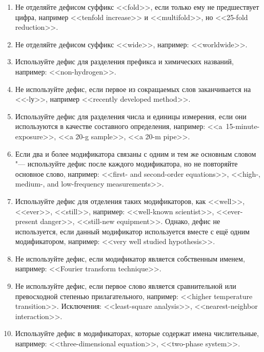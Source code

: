 \documentclass[a5paper, 10pt, twoside, numbers=enddot]{scrartcl}
\begin{document}
\begin{enumerate}
\begin{enumerate}
      \item Не отделяйте дефисом суффикс <<fold>>, если только ему не предшествует цифра, например
        <<tenfold increase>> и <<multifold>>, но <<25-fold reduction>>.

      \item Не отделяйте дефисом суффикс <<wide>>, например: <<worldwide>>.

      \item Используйте дефис для разделения префикса и химических названий, например:
        <<non-hydrogen>>.

      \item Не используйте дефис, если первое из сокращаемых слов заканчивается на <<-lу>>, например
        <<recently developed method>>.

      \item Используйте дефис для разделения числа и единицы измерения, если они используются в
        качестве составного определения, например: <<a~15-minute-exposure>>, <<a 20-g sample>>, <<a
        20-m pipe>>.

      \item Если два и более модификатора связаны с одним и тем же основным словом "--- используйте
        дефис после каждого модификатора, но не повторяйте основное слово, например: <<first- and
        second-order equations>>, <<high-, medium-, and low-frequency measurements>>.

      \item Используйте дефис для отделения таких модификаторов, как <<well>>, <<ever>>, <<still>>,
        например: <<well-known scientist>>, <<ever-present danger>>, <<still-new equipment>>. Однако,
        дефис не используется, если данный модификатор  используется вместе с ещё одним модификатором,
        например: <<very well studied hypothesis>>.

      \item Не используйте дефис, если модификатор является собственным именем, например: <<Fourier
        transform technique>>.

      \item Не используйте дефис, если первое слово является сравнительной или превосходной степенью
        прилагательного, например: <<higher tempera\-tu\-re transition>>. Исключения: <<least-square
        analysis>>, <<nearest-neighbor interaction>>.

      \item Используйте дефис в модификаторах, которые содержат имена числительные, например:
        <<three-dimensional equation>>, <<two-phase system>>.


\end{enumerate}
\end{enumerate}
\end{document}
